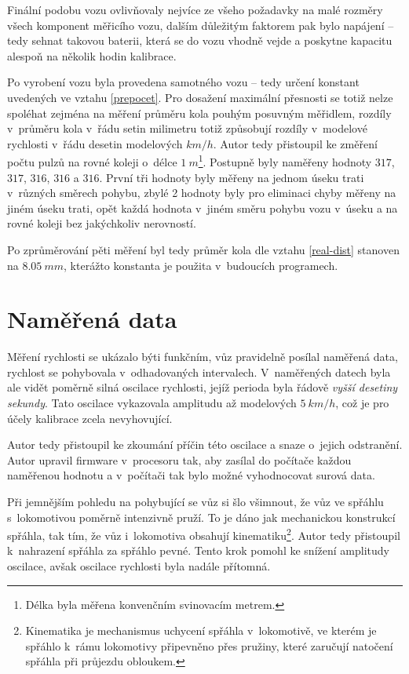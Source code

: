 Finální podobu vozu ovlivňovaly nejvíce ze všeho požadavky na malé rozměry všech
komponent měřicího vozu, dalším důležitým faktorem pak bylo napájení -- tedy
sehnat takovou baterii, která se do vozu vhodně vejde a poskytne kapacitu
alespoň na několik hodin kalibrace.

Po vyrobení vozu byla provedena  samotného vozu -- tedy určení
konstant uvedených ve vztahu \ref{prepocet}. Pro dosažení maximální přesnosti
se totiž nelze spoléhat zejména na měření průměru kola pouhým posuvným
měřidlem, rozdíly v~průměru kola v~řádu setin milimetru totiž způsobují rozdíly
v~modelové rychlosti v~řádu desetin modelových $km/h$. Autor tedy přistoupil ke
změření počtu pulzů na rovné koleji o~délce $1\ m$\footnote{Délka byla měřena
konvenčním svinovacím metrem.}. Postupně byly naměřeny hodnoty $317$, $317$,
$316$, $316$ a $316$. První tři hodnoty byly měřeny na jednom úseku trati
v~různých směrech pohybu, zbylé 2 hodnoty byly pro eliminaci chyby měřeny na
jiném úseku trati, opět každá hodnota v~jiném směru pohybu vozu v~úseku a na
rovné koleji bez jakýchkoliv nerovností.

Po zprůměrování pěti měření byl tedy průměr kola dle vztahu \ref{real-dist}
stanoven na $8.05\ mm$, kterážto konstanta je použita v~budoucích programech.

\section{Naměřená data}
\label{sec:wsm-data}

Měření rychlosti se ukázalo býti funkčním, vůz pravidelně posílal naměřená
data, rychlost se pohybovala v~odhadovaných intervalech. V~naměřených datech
byla ale vidět poměrně silná oscilace rychlosti, jejíž perioda byla řádově
\textit{vyšší desetiny sekundy}. Tato oscilace vykazovala amplitudu až
modelových $5\ km/h$, což je pro účely kalibrace zcela nevyhovující.

Autor tedy přistoupil ke zkoumání příčin této oscilace a snaze o~jejich
odstranění. Autor upravil firmware v~procesoru tak, aby zasílal do počítače
každou naměřenou hodnotu a v~počítači tak bylo možné vyhodnocovat surová data.

Při jemnějším pohledu na pohybující se vůz si šlo všimnout, že vůz ve spřáhlu
s~lokomotivou poměrně intenzivně pruží. To je dáno jak mechanickou konstrukcí
spřáhla, tak tím, že vůz i~lokomotiva obsahují kinematiku\footnote{Kinematika
je mechanismus uchycení spřáhla v~lokomotivě, ve kterém je spřáhlo k~rámu
lokomotivy připevněno přes pružiny, které zaručují natočení spřáhla při
průjezdu obloukem.}.
Autor tedy přistoupil k~nahrazení spřáhla za spřáhlo pevné. Tento krok pomohl
ke snížení amplitudy oscilace, avšak oscilace rychlosti byla nadále přítomná.

